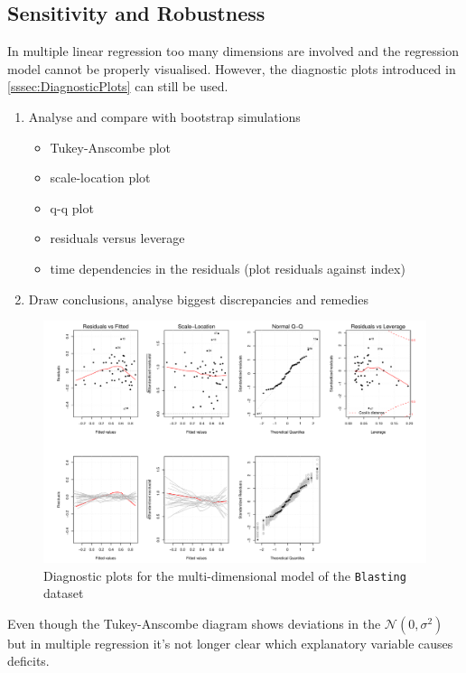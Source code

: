 \documentclass[11pt]{article}
\theoremstyle{definition}
\newcommand*\N[1]{\mathcal{N}\left(#1\right)}
\begin{document}
\subsection{Sensitivity and Robustness}
In multiple linear regression too many dimensions are involved and the regression model cannot be properly visualised. However, the diagnostic plots introduced in \ref{sssec:DiagnosticPlots} can still be used.
\begin{enumerate}
	\item Analyse and compare with bootstrap simulations
	\begin{itemize}
		\item Tukey-Anscombe plot
		\item scale-location plot
		\item q-q plot
		\item residuals versus leverage
		\item time dependencies in the residuals (plot residuals against index)
	\end{itemize}
	\item Draw conclusions, analyse biggest discrepancies and remedies
\end{enumerate}
\begin{figure}[H]
	\centering
	\includegraphics[width=0.8\linewidth]{img/diagnostic_plots_blasting}
	\caption{Diagnostic plots for the multi-dimensional model of the \texttt{Blasting} dataset}
	\label{fig:diagnosticplotsblasting}
\end{figure}
Even though the Tukey-Anscombe diagram shows deviations in the $\N{0,\sigma^2}$ but in multiple regression it's not longer clear which explanatory variable causes deficits.
\end{document}
